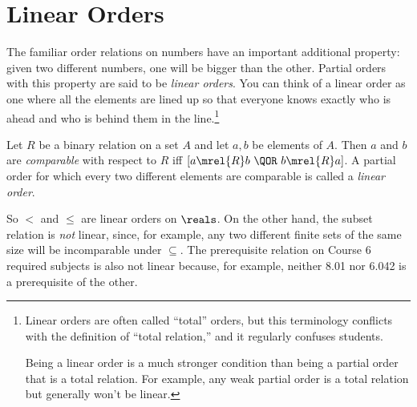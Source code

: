 \section{Linear Orders}\label{linear_order_sec}

The familiar order relations on numbers have an important additional
property: given two different numbers, one will be bigger than the
other.  Partial orders with this property are said to be \emph{linear
  orders}.  You can think of a linear order as one where all the
elements are lined up so that everyone knows exactly who is ahead and
who is behind them in the line.\footnote{Linear orders are often
  called ``total'' orders, but this terminology conflicts with the
  definition of ``total relation,'' and it regularly confuses
  students.

  Being a linear order is a much stronger condition than being a
  partial order that is a total relation.  For example, any weak
  partial order is a total relation but generally won't be linear.}

\begin{definition}\label{def:path_total}
Let $R$ be a binary relation on a set $A$ and let $a, b$ be elements of
$A$.  Then $a$ and $b$ are \emph{comparable} with respect to $R$ iff $[a
  \mrel{R} b\ \QOR\ b \mrel{R} a]$.  A partial order for which every two
different elements are comparable is called a \emph{linear order}.
\end{definition}

So $<$ and $\le$ are linear orders on $\reals$.  On the other hand, the
subset relation is \emph{not} linear, since, for example, any two different
finite sets of the same size will be incomparable under $\subseteq$.  The
prerequisite relation on Course 6 required subjects is also not linear
because, for example, neither 8.01 nor 6.042 is a prerequisite of the
other.

\iffalse
The name linear is based on the following
\begin{lemma}\label{path_total_lem} For any
  finite, nonempty set of vertices from a linear order, there is
  a directed path going through exactly these vertices.  If
  the digraph is a DAG, the directed path is unique.
\end{lemma}
Lemma~\ref{path_total_lem} is easy to prove by induction on the size
of the set of vertices.  The proof is given in
Problem~\ref{CP_tournament_chain}.
\fi

\begin{problems}
\practiceproblems
{}

\classproblems
{}

\homeworkproblems
{}

\examproblems
{}

\end{problems}


